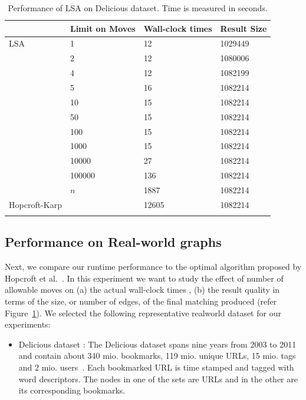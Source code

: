 \begin{table}[ht!]
\centering
\footnotesize
\begin{tabular}{@{}l l l l @{}}
\toprule
\multicolumn{1}{l}{} & Limit on Moves                  & Wall-clock times     & Result Size  \\
\hline \noalign{\smallskip}
LSA        &   1      & 12    & 1029449  \\
       &   2      & 12    & 1080006  \\
        &   4      & 12    & 1082199  \\
        &   5      & 16    & 1082214  \\
        &   10      & 15    & 1082214  \\
        &   50     & 15    & 1082214  \\
        &   100     & 15    & 1082214  \\
        &   1000     & 15    & 1082214  \\
        &   10000    & 27    & 1082214  \\
        &   100000    & 136    & 1082214  \\
        &   $n$    & 1887    & 1082214  \\
\midrule

Hopcroft-Karp                &  & 12605 & 1082214 \\

\hline \noalign{\smallskip}
\end{tabular}
\caption{Performance of LSA on \textsf{Delicious} dataset. Time is measured in seconds.}
\label{table:softlabel}
\end{table}

\subsection{Performance on Real-world graphs}

Next, we compare our runtime performance to the optimal algorithm proposed by Hopcroft et al.~\cite{hopcroft1973n}. In this experiment we want to study the effect of number of allowable moves on (a) the actual wall-clock times , (b) the result quality in terms of the size, or number of edges, of the final matching produced (refer Figure~\ref{table:softlabel}). We selected the following representative realworld dataset for our experiments:

\begin{itemize}
  \item \textsf{Delicious dataset : } The \textsf{Delicious} dataset spans nine years from 2003 to 2011 and contain about 340 mio. bookmarks, 119 mio. unique URLs, 15 mio. tags and 2 mio. users~\cite{zubiaga2013harnessing}. Each bookmarked URL is time stamped and tagged with word descriptors. The nodes in one of the sets are URLs and in the other are its corresponding bookmarks.

\end{itemize}

